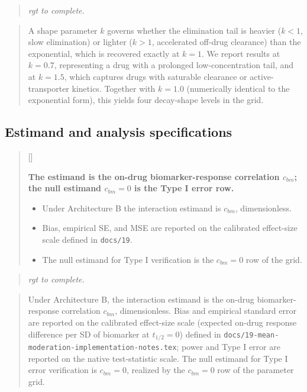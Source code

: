 \documentclass[
  11pt,
]{article}
\newcounter{pgraph}
\newenvironment{bullets}{%
  \stepcounter{pgraph}%
  \begin{quote}\small\sffamily\color[gray]{0.30}%
  {\normalfont\scriptsize\color[gray]{0.58}[\thepgraph]\enspace}}{%
  \end{quote}}
\newenvironment{rgt}{%
  \begin{quote}\small\itshape\color[RGB]{20,60,160}}{%
  \end{quote}}
\newenvironment{orig}{%
  \begin{quote}\normalsize\color[gray]{0.55}}{%
  \end{quote}}
\begin{document}
\begin{rgt}
rgt to complete.

\end{rgt}

\begin{orig}
A shape parameter \(k\) governs whether the elimination tail is
heavier (\(k < 1\), slow elimination) or lighter (\(k > 1\), accelerated
off-drug clearance) than the exponential, which is recovered exactly
at \(k = 1\). We report results at \(k = 0.7\), representing a drug with
a prolonged low-concentration tail, and at \(k = 1.5\), which captures
drugs with saturable clearance or active-transporter kinetics.
Together with \(k = 1.0\) (numerically identical to the exponential
form), this yields four decay-shape levels in the grid.

\end{orig}

\subsection{Estimand and analysis specifications}\label{estimand-and-analysis-specifications}

\begin{bullets}

\textbf{The estimand is the on-drug biomarker-response correlation
$c_{bm}$; the null estimand $c_{bm} = 0$ is the Type I error row.}

\begin{itemize}\setlength{\itemsep}{2pt}\setlength{\parskip}{0pt}
\item Under Architecture B the interaction estimand is $c_{bm}$,
dimensionless.
\item Bias, empirical SE, and MSE are reported on the calibrated
effect-size scale defined in \texttt{docs/19}.
\item The null estimand for Type I verification is the $c_{bm} = 0$
row of the grid.
\end{itemize}

\end{bullets}

\begin{rgt}
rgt to complete.

\end{rgt}

\begin{orig}
Under Architecture B, the interaction estimand is the on-drug
biomarker-response correlation \(c_{bm}\), dimensionless. Bias and
empirical standard error are reported on the calibrated effect-size
scale (expected on-drug response difference per SD of biomarker at
\(t_{1/2} = 0\)) defined in
\texttt{docs/19-mean-moderation-implementation-notes.tex}; power and Type I
error are reported on the native test-statistic scale. The null
estimand for Type I error verification is \(c_{bm} = 0\), realized by
the \(c_{bm} = 0\) row of the parameter grid.

\end{orig}
\end{document}
